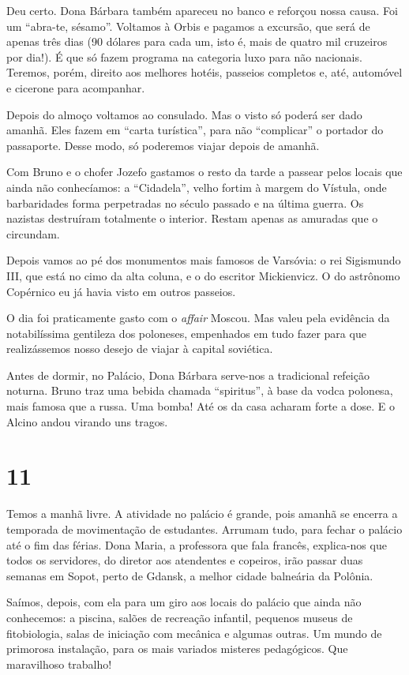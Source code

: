 Deu certo. Dona Bárbara também apareceu no banco e reforçou nossa causa. Foi um ``abra-te, sésamo''. Voltamos à Orbis e pagamos a excursão, que será de apenas três dias (90 dólares para cada um, isto é, mais de quatro mil cruzeiros por dia!). É que só fazem programa na categoria luxo para não nacionais. Teremos, porém, direito aos melhores hotéis, passeios completos e, até, automóvel e cicerone para acompanhar.

Depois do almoço voltamos ao consulado. Mas o visto só poderá ser dado amanhã. Eles fazem em ``carta turística'', para não ``complicar'' o portador do passaporte. Desse modo, só poderemos viajar depois de amanhã.

Com Bruno e o chofer Jozefo gastamos o resto da tarde a passear pelos locais que ainda não conhecíamos: a ``Cidadela'', velho fortim à margem do Vístula, onde barbaridades forma perpetradas no século passado e na última guerra. Os nazistas destruíram totalmente o interior. Restam apenas as amuradas que o circundam.

Depois vamos ao pé dos monumentos mais famosos de Varsóvia: o rei Sigismundo III, que está no cimo da alta coluna, e o do escritor Mickienvicz. O do astrônomo Copérnico eu já havia visto em outros passeios.

O dia foi praticamente gasto com o \textit{affair} Moscou. Mas valeu pela evidência da notabilíssima gentileza dos poloneses, empenhados em tudo fazer para que realizássemos nosso desejo de viajar à capital soviética.

Antes de dormir, no Palácio, Dona Bárbara serve-nos a tradicional refeição noturna. Bruno traz uma bebida chamada ``spiritus'', à base da vodca polonesa, mais famosa que a russa. Uma bomba! Até os da casa acharam forte a dose. E o Alcino andou virando uns tragos.

\section*{11 \adfflatleafright {}}
Temos a manhã livre. A atividade no palácio é grande, pois amanhã se encerra a temporada de movimentação de estudantes. Arrumam tudo, para fechar o palácio até o fim das férias. Dona Maria, a professora que fala francês, explica-nos que todos os servidores, do diretor aos atendentes e copeiros, irão passar duas semanas em Sopot, perto de Gdansk, a melhor cidade balneária da Polônia.

Saímos, depois, com ela para um giro aos locais do palácio que ainda não conhecemos: a piscina, salões de recreação infantil, pequenos museus de fitobiologia, salas de iniciação com mecânica e algumas outras. Um mundo de primorosa instalação, para os mais variados misteres pedagógicos. Que maravilhoso trabalho!

